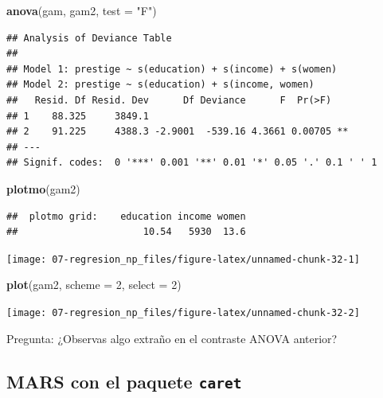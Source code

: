 \documentclass[
]{book}
\newenvironment{Shaded}{\begin{snugshade}}{\end{snugshade}}
\newcommand{\DataTypeTok}[1]{\textcolor[rgb]{0.13,0.29,0.53}{#1}}
\newcommand{\DecValTok}[1]{\textcolor[rgb]{0.00,0.00,0.81}{#1}}
\newcommand{\KeywordTok}[1]{\textcolor[rgb]{0.13,0.29,0.53}{\textbf{#1}}}
\newcommand{\NormalTok}[1]{#1}
\newcommand{\StringTok}[1]{\textcolor[rgb]{0.31,0.60,0.02}{#1}}
\theoremstyle{break}
\theoremstyle{definition}
\theoremstyle{definition}
\theoremstyle{definition}
\theoremstyle{remark}
\begin{document}
\begin{Shaded}
\begin{Highlighting}[]
\KeywordTok{anova}\NormalTok{(gam, gam2, }\DataTypeTok{test =} \StringTok{"F"}\NormalTok{)}
\end{Highlighting}
\end{Shaded}

\begin{verbatim}
## Analysis of Deviance Table
## 
## Model 1: prestige ~ s(education) + s(income) + s(women)
## Model 2: prestige ~ s(education) + s(income, women)
##   Resid. Df Resid. Dev      Df Deviance      F  Pr(>F)   
## 1    88.325     3849.1                                   
## 2    91.225     4388.3 -2.9001  -539.16 4.3661 0.00705 **
## ---
## Signif. codes:  0 '***' 0.001 '**' 0.01 '*' 0.05 '.' 0.1 ' ' 1
\end{verbatim}

\begin{Shaded}
\begin{Highlighting}[]
\KeywordTok{plotmo}\NormalTok{(gam2)}
\end{Highlighting}
\end{Shaded}

\begin{verbatim}
##  plotmo grid:    education income women
##                      10.54   5930  13.6
\end{verbatim}

\begin{center}\texttt{[image: 07-regresion\_np\_files/figure-latex/unnamed-chunk-32-1]} \end{center}

\begin{Shaded}
\begin{Highlighting}[]
\KeywordTok{plot}\NormalTok{(gam2, }\DataTypeTok{scheme =} \DecValTok{2}\NormalTok{, }\DataTypeTok{select =} \DecValTok{2}\NormalTok{)}
\end{Highlighting}
\end{Shaded}

\begin{center}\texttt{[image: 07-regresion\_np\_files/figure-latex/unnamed-chunk-32-2]} \end{center}

Pregunta: ¿Observas algo extraño en el contraste ANOVA anterior?

\hypertarget{mars-con-el-paquete-caret}{%
\subsection{\texorpdfstring{MARS con el paquete \texttt{caret}}{MARS con el paquete caret}}\label{mars-con-el-paquete-caret}}
\end{document}

